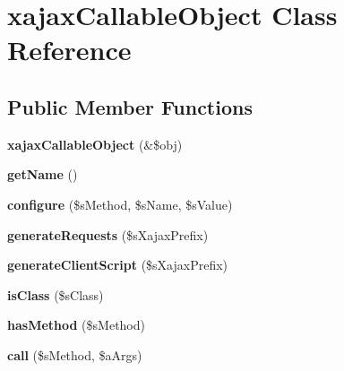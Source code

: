 \hypertarget{classxajaxCallableObject}{
\section{xajaxCallableObject Class Reference}
\label{classxajaxCallableObject}
}
\subsection*{Public Member Functions}
\begin{DoxyCompactItemize}
\item 
\hypertarget{classxajaxCallableObject_a6159a54ae82a1676d0e4f60e64c36dc0}{
{\bfseries xajaxCallableObject} (\&\$obj)}
\label{classxajaxCallableObject_a6159a54ae82a1676d0e4f60e64c36dc0}

\item 
\hypertarget{classxajaxCallableObject_a2e47ebdac784a85efa555fa22abe990f}{
{\bfseries getName} ()}
\label{classxajaxCallableObject_a2e47ebdac784a85efa555fa22abe990f}

\item 
\hypertarget{classxajaxCallableObject_ad1dd65f34ee1f220b593e2ead07b4f93}{
{\bfseries configure} (\$sMethod, \$sName, \$sValue)}
\label{classxajaxCallableObject_ad1dd65f34ee1f220b593e2ead07b4f93}

\item 
\hypertarget{classxajaxCallableObject_a36ab2491d3502b1ad27ca7a9a9f5def2}{
{\bfseries generateRequests} (\$sXajaxPrefix)}
\label{classxajaxCallableObject_a36ab2491d3502b1ad27ca7a9a9f5def2}

\item 
\hypertarget{classxajaxCallableObject_a40a51b0f33d3e2c5e8baf20618a24fd5}{
{\bfseries generateClientScript} (\$sXajaxPrefix)}
\label{classxajaxCallableObject_a40a51b0f33d3e2c5e8baf20618a24fd5}

\item 
\hypertarget{classxajaxCallableObject_a9d284eea30f3e951354cccfb98a22b4b}{
{\bfseries isClass} (\$sClass)}
\label{classxajaxCallableObject_a9d284eea30f3e951354cccfb98a22b4b}

\item 
\hypertarget{classxajaxCallableObject_a19fbd4bee7e707336794fc0c0ce24487}{
{\bfseries hasMethod} (\$sMethod)}
\label{classxajaxCallableObject_a19fbd4bee7e707336794fc0c0ce24487}

\item 
\hypertarget{classxajaxCallableObject_afc00ac16c31798e937eebe9b2d5ab22d}{
{\bfseries call} (\$sMethod, \$aArgs)}
\label{classxajaxCallableObject_afc00ac16c31798e937eebe9b2d5ab22d}

\end{DoxyCompactItemize}
